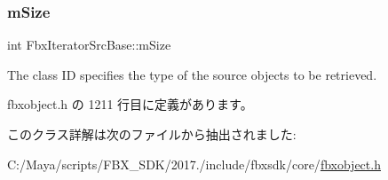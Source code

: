 \mbox{\label{class_fbx_iterator_src_base_a267938478933f2405b32bf9722648d36}} 
\subsubsection{\texorpdfstring{m\+Size}{mSize}}
{\footnotesize\ttfamily int Fbx\+Iterator\+Src\+Base\+::m\+Size\hspace{0.3cm}{\ttfamily [protected]}}



The class ID specifies the type of the source objects to be retrieved. 



 fbxobject.\+h の 1211 行目に定義があります。



このクラス詳解は次のファイルから抽出されました\+:\begin{DoxyCompactItemize}
\item 
C\+:/\+Maya/scripts/\+F\+B\+X\+\_\+\+S\+D\+K/2017./include/fbxsdk/core/\hyperlink{fbxobject_8h}{fbxobject.\+h}\end{DoxyCompactItemize}
